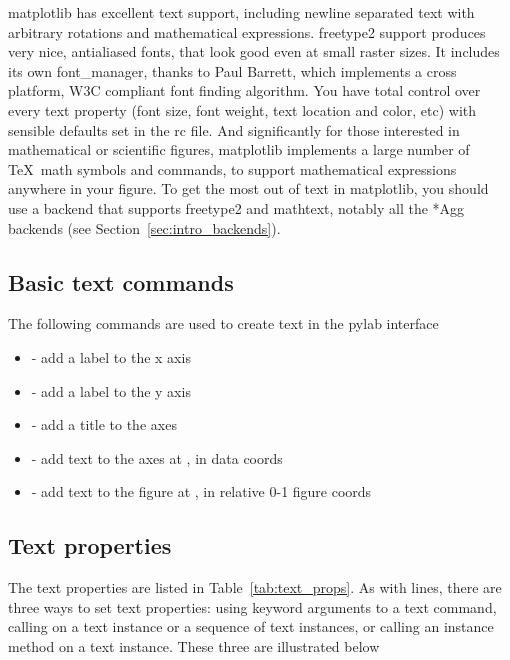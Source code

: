 \documentclass[twoside]{book}
\begin{document}
matplotlib has excellent text support, including newline separated
text with arbitrary rotations and mathematical expressions.  freetype2
support produces very nice, antialiased fonts, that look good even at
small raster sizes.  It includes its own font\_manager, thanks to Paul
Barrett, which implements a cross platform, W3C compliant font finding
algorithm.  You have total control over every text property (font
size, font weight, text location and color, etc) with sensible
defaults set in the rc file.  And significantly for those interested
in mathematical or scientific figures, matplotlib implements a large
number of \TeX\ math symbols and commands, to support mathematical
expressions anywhere in your figure.  To get the most out of text in
matplotlib, you should use a backend that supports freetype2 and
mathtext, notably all the *Agg backends (see Section~\ref{sec:intro_backends}).

\subsection{Basic text commands}
\label{sec:basic_text}

The following commands are used to create text in the pylab
interface

\begin{itemize}
  \item {} - add a label  to the x axis
  \item {} - add a label  to the y axis
  \item {} - add a title  to the axes
  \item {} - add text  to the axes at
    ,  in data coords
  \item {} - add text to the figure at ,
     in relative 0-1 figure coords
\end{itemize}



\subsection{Text properties}
\label{sec:text_props}

The text properties are listed in Table~\ref{tab:text_props}.  As with
lines, there are three ways to set text properties: using keyword
arguments to a text command, calling  on a text instance or
a sequence of text instances, or calling an instance method on a text
instance.  These three are illustrated below
\end{document}
